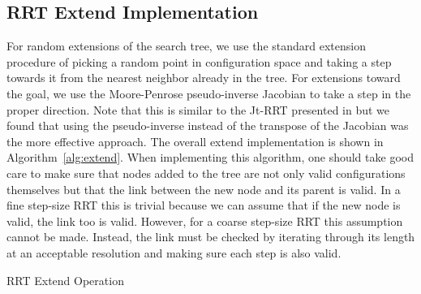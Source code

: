 \documentclass[conference]{IEEEtran}
\begin{document}
\subsection{RRT Extend Implementation}
For random extensions of the search tree, we use the standard extension procedure of picking a random point in configuration space and
taking a step towards it from the nearest neighbor already in the tree. For extensions toward the goal, we use the Moore-Penrose
pseudo-inverse Jacobian to take a step in the proper direction. Note that this is similar to the Jt-RRT presented in \cite{vande07} but we
found that using the pseudo-inverse instead of the transpose of the Jacobian was the more effective approach. The overall extend
implementation is shown in Algorithm~\ref{alg:extend}. When implementing this algorithm, one should take good care to make sure that nodes
added to the tree are not only valid configurations themselves but that the link between the new node and its parent is valid. In a fine
step-size RRT this is trivial because we can assume that if the new node is valid, the link too is valid. However, for a coarse step-size
RRT this assumption cannot be made. Instead, the link must be checked by iterating through its length at an acceptable resolution and making
sure each step is also valid.
\begin{algorithm}
 \label{alg:extend}
 \SetAlgoLined
\caption{RRT Extend Operation}
\end{algorithm}
\end{document}
